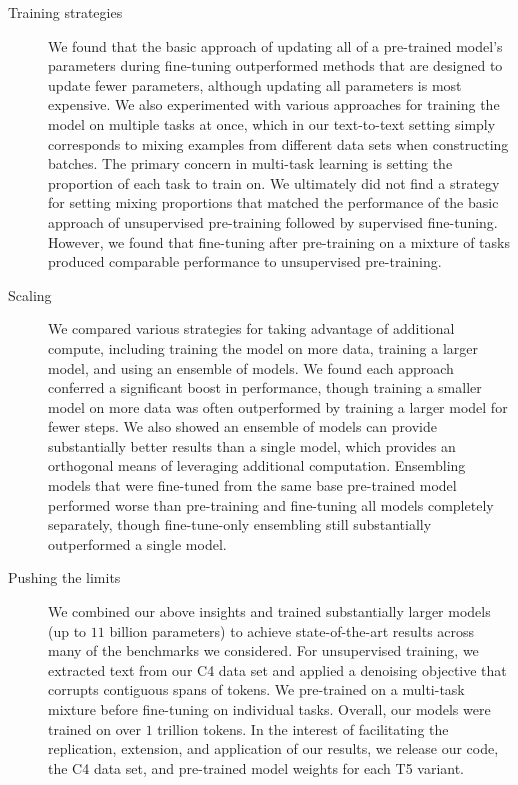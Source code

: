 \documentclass[twoside,11pt]{article}
\makeatletter
\newcommand\footnoteref[1]{\protected@xdef\@thefnmark{\ref{#1}}\@footnotemark}
\makeatother
\begin{document}
\begin{description}
\item[Training strategies] We found that the basic approach of updating all of a pre-trained model's parameters during fine-tuning outperformed methods that are designed to update fewer parameters, although updating all parameters is most expensive.
We also experimented with various approaches for training the model on multiple tasks at once, which in our text-to-text setting simply corresponds to mixing examples from different data sets when constructing batches.
The primary concern in multi-task learning is setting the proportion of each task to train on.
We ultimately did not find a strategy for setting mixing proportions that matched the performance of the basic approach of unsupervised pre-training followed by supervised fine-tuning.
However, we found that fine-tuning after pre-training on a mixture of tasks produced comparable performance to unsupervised pre-training.

\item[Scaling] We compared various strategies for taking advantage of additional compute, including training the model on more data, training a larger model, and using an ensemble of models.
We found each approach conferred a significant boost in performance, though training a smaller model on more data was often outperformed by training a larger model for fewer steps.
We also showed an ensemble of models can provide substantially better results than a single model, which provides an orthogonal means of leveraging additional computation.
Ensembling models that were fine-tuned from the same base pre-trained model performed worse than pre-training and fine-tuning all models completely separately, though fine-tune-only ensembling still substantially outperformed a single model.

\item[Pushing the limits] We combined our above insights and trained substantially larger models (up to $11$ billion parameters) to achieve state-of-the-art results across many of the benchmarks we considered.
For unsupervised training, we extracted text from our C4 data set and applied a denoising objective that corrupts contiguous spans of tokens.
We pre-trained on a multi-task mixture before fine-tuning on individual tasks.
Overall, our models were trained on over $1$ trillion tokens.
In the interest of facilitating the replication, extension, and application of our results, we release our code, the C4 data set, and pre-trained model weights for each T5 variant.\footnoteref{fn:oss}

\end{description}
\end{document}
